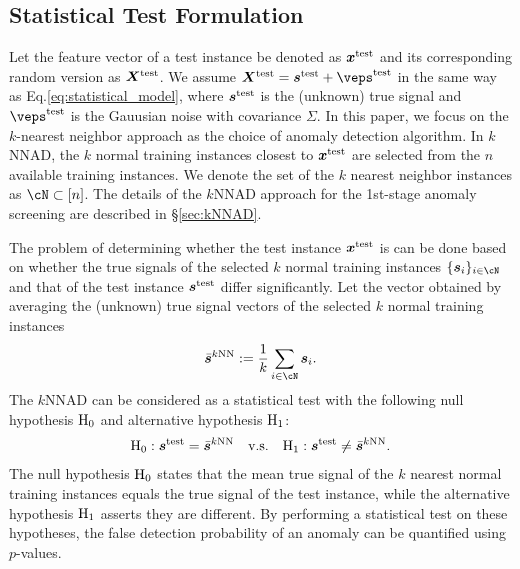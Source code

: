 \subsection{Statistical Test Formulation}
\label{subsec:kNNAD-test}
%
Let the feature vector of a test instance be denoted as $\bm{x}^{\rm test}$ and its corresponding random version as $\bm X^{\rm test}$. 
%
We assume $\bm X^{\rm test} = \bm{s}^{\rm test} + \bm \veps^{\rm test}$ in the same way as Eq.\eqref{eq:statistical_model}, where $\bm{s}^{\rm test}$ is the (unknown) true signal and $\bm \veps^{\rm test}$ is the Gauusian noise with covariance $\Sigma$.
%
In this paper, we focus on the $k$-nearest neighbor approach as the choice of anomaly detection algorithm.
%
In $k$NNAD, the $k$ normal training instances closest to $\bm{x}^{\rm test}$ are selected from the $n$ available training instances.
%
We denote the set of the $k$ nearest neighbor instances as $\cN \subset [n]$.
%
The details of the $k$NNAD approach for the 1st-stage anomaly screening are described in \S\ref{sec:kNNAD}.

The problem of determining whether the test instance $\bm x^{\rm test}$ is can be done based on whether the true signals of the selected $k$ normal training instances $\{\bm s_i\}_{i \in \cN}$ and that of the test instance $\bm s^{\rm test}$ differ significantly.
%
Let the vector obtained by averaging the (unknown) true signal vectors of the selected $k$ normal training instances 
\begin{align}
 \bar{\bm s}^{\text{$k$NN}} := \frac{1}{k} \sum_{i \in \cN} \bm s_i.
\end{align}
%
The $k$NNAD can be considered as a statistical test with the following null hypothesis ${\rm H}_0$ and alternative hypothesis ${\rm H}_1$:  
\begin{align}
 \label{eq:H0_H1}
 {\rm H}_0: \bm s^{\rm test} = \bar{\bm s}^{\text{$k$NN}}
 ~~~{\text{v.s.}}~~~
 {\rm H}_1: \bm s^{\rm test} \neq \bar{\bm s}^{\text{$k$NN}}.
\end{align}
%
The null hypothesis ${\rm H}_0$ states that the mean true signal of the $k$ nearest normal training instances equals the true signal of the test instance, while the alternative hypothesis ${\rm H}_1$ asserts they are different.
%
By performing a statistical test on these hypotheses, the false detection probability of an anomaly can be quantified using $p$-values.

